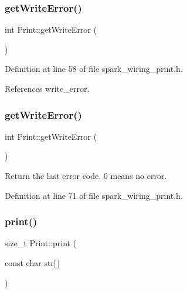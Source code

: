 \mbox{\label{class_print_a88a4a829fb5d589efb43955ad0cbddcc}} 
\subsubsection{\texorpdfstring{get\+Write\+Error()}{getWriteError()}\hspace{0.1cm}{\footnotesize\ttfamily [1/2]}}
{\footnotesize\ttfamily int Print\+::get\+Write\+Error (\begin{DoxyParamCaption}{ }\end{DoxyParamCaption})\hspace{0.3cm}{\ttfamily [inline]}}



Definition at line 58 of file spark\+\_\+wiring\+\_\+print.\+h.



References write\+\_\+error.

\mbox{\label{class_print_a88a4a829fb5d589efb43955ad0cbddcc}} 
\subsubsection{\texorpdfstring{get\+Write\+Error()}{getWriteError()}\hspace{0.1cm}{\footnotesize\ttfamily [2/2]}}
{\footnotesize\ttfamily int Print\+::get\+Write\+Error (\begin{DoxyParamCaption}{ }\end{DoxyParamCaption})\hspace{0.3cm}{\ttfamily [inline]}}



Return the last error code. 0 means no error. 



Definition at line 71 of file spark\+\_\+wiring\+\_\+print.\+h.

\mbox{\label{class_print_acfe80773011eb17dfb52c2fba517a093}} 
\subsubsection{\texorpdfstring{print()}{print()}\hspace{0.1cm}{\footnotesize\ttfamily [1/19]}}
{\footnotesize\ttfamily size\+\_\+t Print\+::print (\begin{DoxyParamCaption}\item[{const char}]{str\mbox{[}$\,$\mbox{]} }\end{DoxyParamCaption})}



